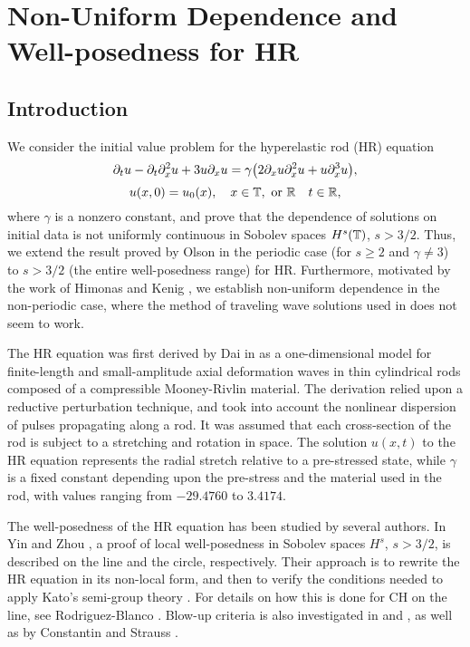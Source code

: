 \chapter{Non-Uniform Dependence and Well-posedness for 
HR}
\section{Introduction}
%
We consider the  initial value problem for
the hyperelastic rod (HR)  equation
%
%
\begin{equation}
\label{hr}
\partial_t u
-
\partial_t \partial_x^2 u
+
3u\partial_x u
=
\gamma \big (
2\partial_x u \partial_x^2 u
+
u \partial_x^3 u
\big ),
\end{equation}
%
%
%
%
\begin{equation}
\label{hr-data} u(x, 0) = u_0 (x),
\quad x  \in \mathbb{T}, \text{  or  } \mathbb{R} \quad t \in \mathbb{R},
\end{equation}
%
%
where  $\gamma$  is a  nonzero constant,
and prove that the dependence of solutions on initial data is not uniformly 
continuous in Sobolev spaces $H^s(\mathbb{T})$, $s>3/2$.
Thus, we extend the result proved by Olson 
\cite{Olson_2006_Non-uniform-dep} in the periodic
case (for $s\ge 2$ and $\gamma \ne 3$)  to  $s>3/2$ (the entire 
well-posedness range)
for HR. Furthermore,  motivated by the work of
 Himonas  and Kenig \cite{Himonas:2009fk},
we establish non-uniform dependence
in the non-periodic case, where the method of traveling wave solutions used in  
\cite{Olson_2006_Non-uniform-dep} does not seem to work.
%
%

The HR equation was first
derived by Dai in \cite{Dai_1998_Model-equations} as a one-dimensional 
model for finite-length and
small-amplitude axial deformation waves in thin cylindrical
rods composed of a compressible Mooney-Rivlin
material. The derivation relied upon a reductive perturbation technique, 
and took into account the nonlinear dispersion of pulses propagating 
along a rod. It was assumed that each cross-section of the rod is 
subject to a stretching and rotation in space. The solution $u(x,t)$ to the 
HR equation represents the radial stretch relative
to a pre-stressed state, while $\gamma$ is a fixed constant depending upon 
the pre-stress and the material used in
the rod, with values ranging from $- 29.4760$ to $3.4174$.

%
The well-posedness of the HR equation has been studied by several authors. 
In Yin \cite{Yin_2003_On-the-Cauchy-p} and Zhou 
\cite{Zhou_2005_Local-well-pose}, a proof of local well-posedness in Sobolev 
spaces $H^s$,  $s > 3/2$, is described  on the line and the circle, respectively. 
Their approach is to rewrite the HR equation   
in its non-local form, and then to verify the conditions needed to apply 
Kato's semi-group theory \cite{Kato_1975_Quasi-linear-eq}. 
For details on how this is done for CH on the line, see Rodriguez-Blanco 
\cite{Rodriguez-Blanco_2001_On-the-Cauchy-p}. Blow-up criteria 
is also investigated in \cite{Yin_2003_On-the-Cauchy-p} and 
\cite{Zhou_2005_Local-well-pose}, as well as by Constantin and Strauss 
\cite{Constantin_2000_Stability-of-a-}. 


